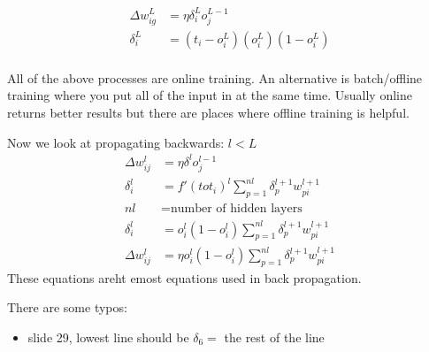 \documentclass{article}
\begin{document}
\begin{align*}
	\Delta w_{ig}^L &= \eta \delta_i^L o_j^{L-1}\\
	\delta_i^L &= (t_i - o_i^L)(o_i^L)(1-o_i^L)\\
\end{align*}


All of the above processes are online training. An alternative is batch/offline training where you put all of the input in at the same time. Usually online returns better results but there are places where offline training is helpful.

Now we look at propagating backwards: $l < L$
\begin{align*}
	\Delta w_{ij}^l &= \eta \delta^lo_j^{l-1}\\
	\delta_i^l &= f'(tot_i)^l \sum_{p=1}^{nl} \delta_p^{l+1}w_{pi}^{l+1}\\
	nl &= \text{number of hidden layers}\\
	\delta_i^l &= o_i^l(1-o_i^l)\sum_{p=1}^{nl} \delta_p^{l+1}w_{pi}^{l+1}\\
	\Delta w_{ij}^l &= \eta o_i^l(1-o_i^l) \sum_{p=1}^{nl} \delta_p^{l+1}w_{pi}^{l+1}
\end{align*}
These equations areht emost equations used in back propagation.

There are some typos:
\begin{itemize}
	\item slide 29, lowest line should be $\delta_6 = $ the rest of the line
\end{itemize}
\end{document}
